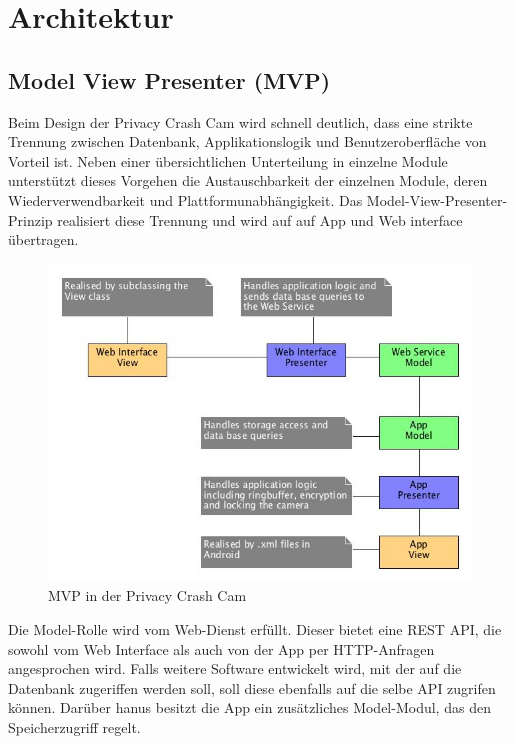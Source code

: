 \chapter{Architektur}
\section{Model View Presenter (MVP)}
Beim Design der Privacy Crash Cam wird schnell deutlich, dass eine strikte Trennung zwischen Datenbank, Applikationslogik und Benutzeroberfläche von Vorteil ist. Neben einer übersichtlichen Unterteilung in einzelne Module unterstützt dieses Vorgehen die Austauschbarkeit der einzelnen Module, deren Wiederverwendbarkeit und Plattformunabhängigkeit. Das Model-View-Presenter-Prinzip realisiert diese Trennung und wird auf auf App und Web interface übertragen.\linebreak\par

\begin{figure}[ht]
	\centering
\includegraphics[width=1\textwidth]{./resources/Diagramme/overview_mvp.jpg}
\caption{MVP in der Privacy Crash Cam}
	\label{fig:overview_mvp}
\end{figure}

Die Model-Rolle wird vom Web-Dienst erfüllt. Dieser bietet eine REST API, die sowohl vom Web Interface als auch von der App per HTTP-Anfragen angesprochen wird. Falls weitere Software entwickelt wird, mit der auf die Datenbank zugeriffen werden soll, soll diese ebenfalls auf die selbe API zugrifen können.\linebreak
Darüber hanus besitzt die App ein zusätzliches Model-Modul, das den Speicherzugriff regelt.\linebreak\par

